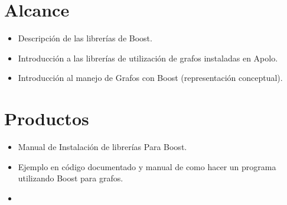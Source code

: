 \section{Alcance}
	\begin{itemize}
		\item Descripción de las librerías de Boost.
		\item Introducción a las librerías de utilización de grafos instaladas en Apolo.
		\item Introducción al manejo de Grafos con Boost (representación conceptual).
	\end{itemize}

\section{Productos}
	\begin{itemize}
		\item Manual de Instalación de librerías Para Boost.
		\item Ejemplo en código documentado y manual de como hacer un programa utilizando Boost para grafos.	
		\item 
	\end{itemize}

